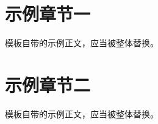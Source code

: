 \documentclass[11pt]{ctexart}
\begin{document}
\maketitle

\begin{abstract}
模板自带示例摘要，应当被替换。
\end{abstract}

\section{示例章节一}

模板自带的示例正文，应当被整体替换。

\section{示例章节二}

模板自带的示例正文，应当被整体替换。
\end{document}
